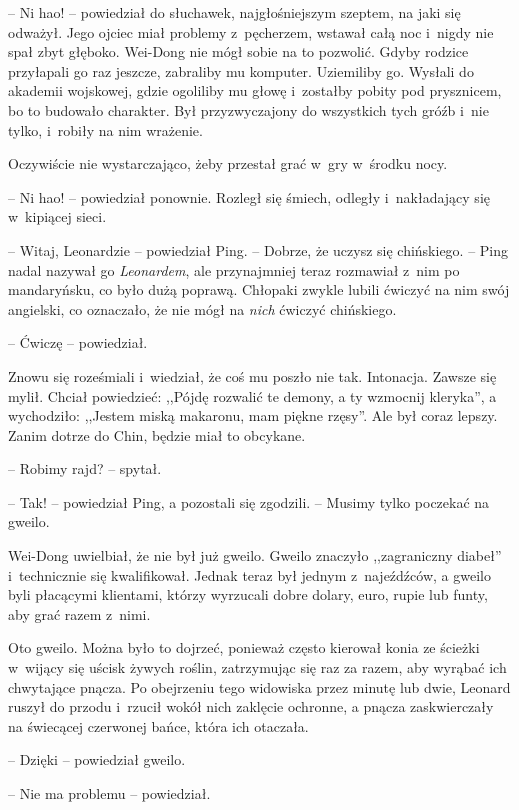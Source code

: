 \documentclass[oneside,polish,11pt,rmheadings]{mwbk}
\begin{document}
-- Ni hao! -- powiedział do słuchawek, najgłośniejszym szeptem, na jaki się odważył. Jego ojciec miał problemy z~pęcherzem, wstawał całą noc i~nigdy nie spał zbyt głęboko. Wei-Dong nie mógł sobie na to pozwolić. Gdyby rodzice przyłapali go raz jeszcze, zabraliby mu komputer. Uziemiliby go. Wysłali do akademii wojskowej, gdzie ogoliliby mu głowę i~zostałby pobity pod prysznicem, bo to budowało charakter. Był przyzwyczajony do wszystkich tych gróźb i~nie tylko, i~robiły na nim wrażenie. 


Oczywiście nie wystarczająco, żeby przestał grać w~gry w~środku nocy. 


-- Ni hao! -- powiedział ponownie. Rozległ się śmiech, odległy i~nakładający się w~kipiącej sieci. 


-- Witaj, Leonardzie -- powiedział Ping. -- Dobrze, że uczysz się chińskiego. -- Ping nadal nazywał go \textit{Leonardem}, ale przynajmniej teraz rozmawiał z~nim po mandaryńsku, co było dużą poprawą. Chłopaki zwykle lubili ćwiczyć na nim swój angielski, co oznaczało, że nie mógł na \textit{nich }ćwiczyć chińskiego. 


-- Ćwiczę -- powiedział. 


Znowu się roześmiali i~wiedział, że coś mu poszło nie tak. Intonacja. Zawsze się mylił. Chciał powiedzieć: ,,Pójdę rozwalić te demony, a ty wzmocnij kleryka'', a wychodziło: ,,Jestem miską makaronu, mam piękne rzęsy''. Ale był coraz lepszy. Zanim dotrze do Chin, będzie miał to obcykane. 


-- Robimy rajd? -- spytał. 


-- Tak! -- powiedział Ping, a pozostali się zgodzili. -- Musimy tylko poczekać na gweilo. 

Wei-Dong uwielbiał, że nie był już gweilo. Gweilo znaczyło ,,zagraniczny diabeł'' i~technicznie się kwalifikował. Jednak teraz był jednym z~najeźdźców, a gweilo byli płacącymi klientami, którzy wyrzucali dobre dolary, euro, rupie lub funty, aby grać razem z~nimi. 


Oto gweilo. Można było to dojrzeć, ponieważ często kierował konia ze ścieżki w~wijący się uścisk żywych roślin, zatrzymując się raz za razem, aby wyrąbać ich chwytające pnącza. Po obejrzeniu tego widowiska przez minutę lub dwie, Leonard ruszył do przodu i~rzucił wokół nich zaklęcie ochronne, a pnącza zaskwierczały na świecącej czerwonej bańce, która ich otaczała. 


-- Dzięki -- powiedział gweilo. 


-- Nie ma problemu -- powiedział. 
\end{document}
